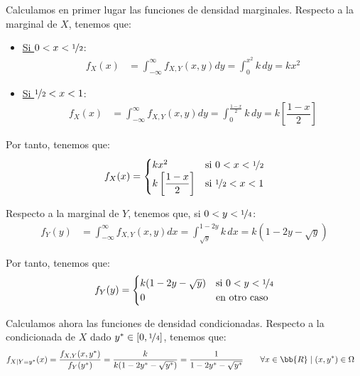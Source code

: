 \documentclass[12pt]{article}
\begin{document}
\begin{ejercicio}[5 puntos]
\begin{enumerate}
            Calculamos en primer lugar las funciones de densidad marginales. Respecto a la marginal de $X$, tenemos que:
            \begin{itemize}
                \item \ul{Si $0<x<\nicefrac{1}{2}$}:
                \begin{align*}
                    f_X(x) &= \int_{-\infty}^{\infty} f_{X,Y}(x,y)dy
                    = \int_{0}^{x^2} k\,dy
                    = kx^2
                \end{align*}

                \item \ul{Si $\nicefrac{1}{2}<x<1$}:
                \begin{align*}
                    f_X(x) &= \int_{-\infty}^{\infty} f_{X,Y}(x,y)dy
                    = \int_{0}^{\frac{1-x}{2}} k\,dy
                    = k\left[\dfrac{1-x}{2}\right]
                \end{align*}
            \end{itemize}

            Por tanto, tenemos que:
            \begin{equation*}
                f_X(x) = \begin{cases}
                    kx^2 & \text{si } 0<x<\nicefrac{1}{2}\\
                    k\left[\dfrac{1-x}{2}\right] & \text{si } \nicefrac{1}{2}<x<1
                \end{cases}
            \end{equation*}

            Respecto a la marginal de $Y$, tenemos que, si $0<y<\nicefrac{1}{4}$:
            \begin{align*}
                f_Y(y) &= \int_{-\infty}^{\infty} f_{X,Y}(x,y)dx
                = \int_{\sqrt{y}}^{1-2y} k\,dx
                = k(1-2y-\sqrt{y})
            \end{align*}

            Por tanto, tenemos que:
            \begin{equation*}
                f_Y(y) = \begin{cases}
                    k(1-2y-\sqrt{y}) & \text{si } 0<y<\nicefrac{1}{4}\\
                    0 & \text{en otro caso}
                \end{cases}
            \end{equation*}

            Calculamos ahora las funciones de densidad condicionadas. Respecto a la condicionada de $X$ dado $y^*\in \left[0,\nicefrac{1}{4}\right]$, tenemos que:
            \begin{align*}
                f_{X\mid Y=y^*}(x) &= \dfrac{f_{X,Y}(x,y^*)}{f_Y(y^*)}= \dfrac{k}{k(1-2y^*-\sqrt{y^*})} = \dfrac{1}{1-2y^*-\sqrt{y^*}}
                \qquad \forall x\in \bb{R}\mid (x,y^*)\in \Omega
            \end{align*}


\end{enumerate}
\end{ejercicio}
\end{document}
